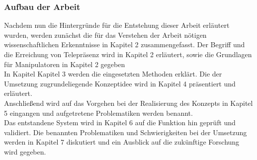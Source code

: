 \subsubsection{Aufbau der Arbeit}
  Nachdem nun die Hintergründe für die Entstehung dieser Arbeit erläutert wurden, werden zunächst die für das Verstehen der Arbeit nötigen wissenschaftlichen Erkenntnisse in Kapitel 2 zusammengefasst. Der Begriff und die Erreichung von Telepräsenz wird in Kapitel 2 erläutert, sowie die Grundlagen für Manipulatoren in Kapitel 2 gegeben\\
  In Kapitel Kapitel 3 werden die eingesetzten Methoden erklärt. Die der Umsetzung zugrundeliegende Konzeptidee wird in Kapitel 4 präsentiert und erläutert.\\
  Anschließend wird auf das Vorgehen bei der Realisierung des Konzepts in Kapitel 5 eingangen und aufgetretene Problematiken werden benannt.\\
  Das entstandene System wird in Kapitel 6 auf die Funktion hin geprüft und validiert. Die benannten Problematiken und Schwierigkeiten bei der Umsetzung werden in Kapitel 7 diskutiert und ein Ausblick auf die zukünftige Forschung wird gegeben.\\
